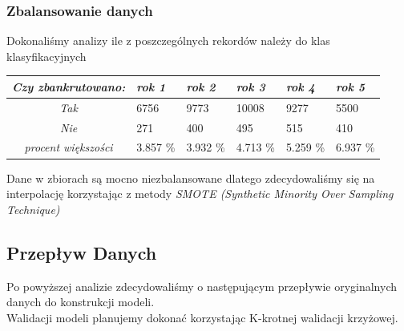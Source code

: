 \documentclass[11pt]{article}
\begin{document}
\subsubsection{Zbalansowanie danych}
Dokonaliśmy analizy ile z poszczególnych rekordów należy do klas klasyfikacyjnych
\begin{center}
	\begin{tabular}{|c|m{0.7in}|m{0.7in}|m{0.7in}|m{0.7in}|m{0.7in}|}
		\hline
		\textit{Czy zbankrutowano:}& \textit{rok 1} & \textit{rok 2} & \textit{rok 3} & \textit{rok 4} & \textit{rok 5} \\ \hline
		\textit{Tak} & 6756 & 9773 & 10008 & 9277 & 5500 \\ \hline
		\textit{Nie} & 271 & 400 & 495 & 515 & 410 \\ \hline \hline
		\textit{procent większości} & 3.857 \% & 3.932 \% & 4.713 \% & 5.259 \% & 6.937 \% \\ \hline
	\end{tabular}
\end{center}
Dane w zbiorach są mocno niezbalansowane dlatego zdecydowaliśmy się na interpolację korzystając z metody \textit{SMOTE (Synthetic Minority Over Sampling Technique)}
\subsection{Przepływ Danych}
Po powyższej analizie zdecydowaliśmy o następującym przepływie oryginalnych danych do konstrukcji modeli.\\
Walidacji modeli planujemy dokonać korzystając K-krotnej walidacji krzyżowej.
\end{document}
